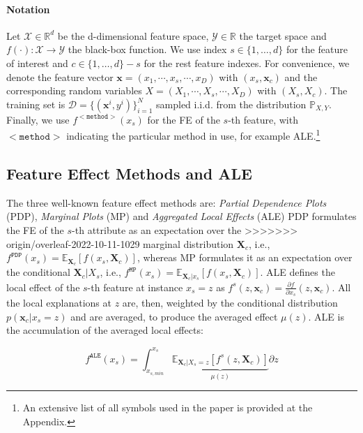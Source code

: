 \documentclass[twoside]{article}
\newcommand{\xc}{\mathbf{x}_c}
\newcommand{\xb}{\mathbf{x}}
\newcommand{\Xcb}{\mathbf{X}_c}
\begin{document}
\paragraph{Notation} 

Let \(\mathcal{X} \in \mathbb{R}^d\) be the d-dimensional feature space, \(\mathcal{Y} \in \mathbb{R}\) the target space and \(f(\cdot) : \mathcal{X} \rightarrow \mathcal{Y}\) the black-box function. We use index \(s \in \{1, \ldots, d\}\) for the feature of interest and \(c \in \{1, \ldots, d\} - s\) for the rest feature indexes. For convenience, we denote the feature vector \(\xb = (x_1, \cdots , x_s, \cdots, x_D)\) with \((x_s, \xc)\) and the corresponding random variables \(X = (X_1, \cdots , X_s, \cdots, X_D)\) with \((X_s, X_c)\). The training set is \(\mathcal{D} = \{(\xb^i, y^i)\}_{i=1}^N\) sampled i.i.d. from the distribution \(\mathbb{P}_{X,Y}\). Finally, we use \(f^{\mathtt{<method>}}(x_s)\) for the FE of the \(s\)-th feature, with \(\mathtt{<method>}\)
indicating the particular method in use, for example ALE.\footnote{An extensive list of all
  symbols used in the paper is provided at the Appendix.}

\subsection{Feature Effect Methods and ALE}
\label{sec:feat-effect-meth}
The three well-known feature effect methods are: \emph{Partial Dependence
  Plots} (PDP)\citep{friedman2001greedy}, \emph{Marginal Plots}
(MP)\citep{apley2020visualizing} and \emph{Aggregated Local Effects}
(ALE)\citep{apley2020visualizing}
PDP
formulates the FE of the \(s\)-th attribute as an expectation over the
>>>>>>> origin/overleaf-2022-10-11-1029
marginal distribution \(\mathbf{X}_c\), i.e.,
\(f^{\mathtt{PDP}}(x_s) =
\mathbb{E}_{\mathbf{X}_c}[f(x_s,\mathbf{X}_c)]\), whereas MP
formulates it as an expectation over the conditional
\(\mathbf{X}_c|X_s\), i.e.,
\(f^{\mathtt{MP}}(x_s) = \mathbb{E}_{\mathbf{X}_c|x_s}[f(x_s,

\mathbf{X}_c)]\). ALE defines the local effect of the \(s\)-th feature
at instance \(x_s = z\) as
\(f^s(z, \xc) = \frac{\partial f}{\partial x_s} (z, \xc)\). All the
local explanations at \(z\) are, then, weighted by the conditional
distribution \(p(\xc|x_s=z)\) and are averaged, to produce the
averaged effect \(\mu(z)\). ALE is the accumulation of the averaged
local effects:

\begin{equation}
  \label{eq:ALE}
  f^{\mathtt{ALE}}(x_s) = \int_{x_{s,min}}^{x_s} \underbrace{\mathbb{E}_{\Xcb|X_s=z}\left [f^s (z, \Xcb)\right ]}_{\mu(z)} \partial z
\end{equation}
\end{document}
